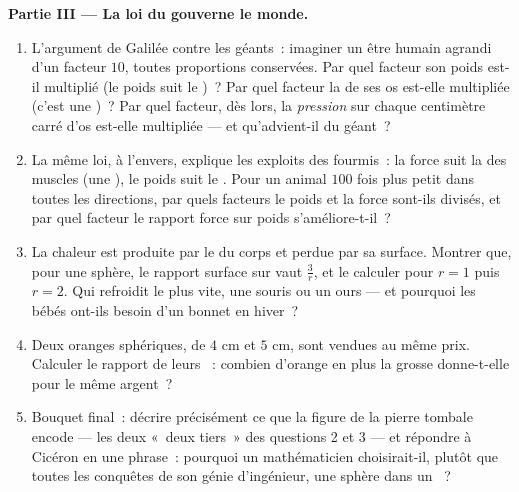 \begin{problem}
\medskip
\noindent\textbf{Partie III --- La loi du  gouverne le
monde.}
\begin{enumerate}[resume]
  \item L'argument de Galilée contre les géants~: imaginer un être
        humain agrandi d'un facteur $10$, toutes proportions
        conservées. Par quel facteur son poids est-il multiplié (le
        poids suit le )~? Par quel facteur la  de ses
        os est-elle multipliée (c'est une )~? Par quel facteur,
        dès lors, la \emph{pression} sur chaque centimètre carré
        d'os est-elle multipliée --- et qu'advient-il du géant~?
  \item La même loi, à l'envers, explique les exploits des
        fourmis~: la force suit la  des muscles (une ),
        le poids suit le . Pour un animal $100$ fois plus
        petit dans toutes les directions, par quels facteurs le
        poids et la force sont-ils divisés, et par quel facteur le
        rapport force sur poids s'améliore-t-il~?
  \item La chaleur est produite par le  du corps et perdue par
        sa surface. Montrer que, pour une sphère, le rapport surface
        sur  vaut $\frac{3}{r}$, et le calculer pour $r = 1$
        puis $r = 2$. Qui refroidit le plus vite, une souris ou un
        ours --- et pourquoi les bébés ont-ils besoin d'un bonnet en
        hiver~?
  \item Deux oranges sphériques, de  $4$ cm et $5$ cm, sont
        vendues au même prix. Calculer le rapport de leurs ~:
        combien d'orange en plus la grosse donne-t-elle pour le même
        argent~?
  \item Bouquet final~: décrire précisément ce que la figure de la
        pierre tombale encode --- les deux «~deux tiers~» des
        questions 2 et 3 --- et répondre à Cicéron en une phrase~:
        pourquoi un mathématicien choisirait-il, plutôt que toutes
        les conquêtes de son génie d'ingénieur, une sphère dans un
        ~?
\end{enumerate}
\end{problem}
